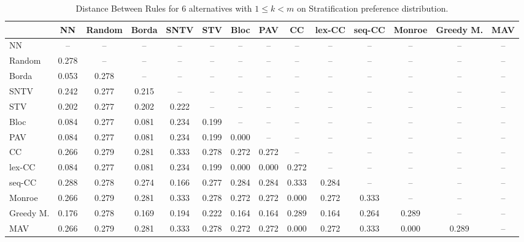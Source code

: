 
\begin{table*}
\centering
\begin{tabular}{lccccccccccccc}
\toprule
 & NN & Random & Borda & SNTV & STV & Bloc & PAV & CC & lex-CC & seq-CC & Monroe & Greedy M. & MAV \\
\midrule
NN & -- & -- & -- & -- & -- & -- & -- & -- & -- & -- & -- & -- & -- \\
Random & 0.278 & -- & -- & -- & -- & -- & -- & -- & -- & -- & -- & -- & -- \\
Borda & 0.053 & 0.278 & -- & -- & -- & -- & -- & -- & -- & -- & -- & -- & -- \\
SNTV & 0.242 & 0.277 & 0.215 & -- & -- & -- & -- & -- & -- & -- & -- & -- & -- \\
STV & 0.202 & 0.277 & 0.202 & 0.222 & -- & -- & -- & -- & -- & -- & -- & -- & -- \\
Bloc & 0.084 & 0.277 & 0.081 & 0.234 & 0.199 & -- & -- & -- & -- & -- & -- & -- & -- \\
PAV & 0.084 & 0.277 & 0.081 & 0.234 & 0.199 & 0.000 & -- & -- & -- & -- & -- & -- & -- \\
CC & 0.266 & 0.279 & 0.281 & 0.333 & 0.278 & 0.272 & 0.272 & -- & -- & -- & -- & -- & -- \\
lex-CC & 0.084 & 0.277 & 0.081 & 0.234 & 0.199 & 0.000 & 0.000 & 0.272 & -- & -- & -- & -- & -- \\
seq-CC & 0.288 & 0.278 & 0.274 & 0.166 & 0.277 & 0.284 & 0.284 & 0.333 & 0.284 & -- & -- & -- & -- \\
Monroe & 0.266 & 0.279 & 0.281 & 0.333 & 0.278 & 0.272 & 0.272 & 0.000 & 0.272 & 0.333 & -- & -- & -- \\
Greedy M. & 0.176 & 0.278 & 0.169 & 0.194 & 0.222 & 0.164 & 0.164 & 0.289 & 0.164 & 0.264 & 0.289 & -- & -- \\
MAV & 0.266 & 0.279 & 0.281 & 0.333 & 0.278 & 0.272 & 0.272 & 0.000 & 0.272 & 0.333 & 0.000 & 0.289 & -- \\
\bottomrule
\end{tabular}

\caption{Distance Between Rules for 6 alternatives with $1 \leq k < m$ on Stratification preference distribution.}
\end{table*}
